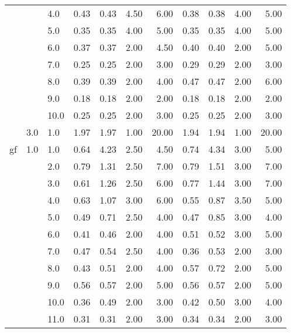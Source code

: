 \begin{tabular}{lllrrrrrrrr}
   &     & 4.0  &       0.43 &      0.43 & 4.50 &   6.00 &       0.38 &      0.38 & 4.00 &   5.00 \\
   &     & 5.0  &       0.35 &      0.35 & 4.00 &   5.00 &       0.35 &      0.35 & 4.00 &   5.00 \\
   &     & 6.0  &       0.37 &      0.37 & 2.00 &   4.50 &       0.40 &      0.40 & 2.00 &   5.00 \\
   &     & 7.0  &       0.25 &      0.25 & 2.00 &   3.00 &       0.29 &      0.29 & 2.00 &   3.00 \\
   &     & 8.0  &       0.39 &      0.39 & 2.00 &   4.00 &       0.47 &      0.47 & 2.00 &   6.00 \\
   &     & 9.0  &       0.18 &      0.18 & 2.00 &   2.00 &       0.18 &      0.18 & 2.00 &   2.00 \\
   &     & 10.0 &       0.25 &      0.25 & 2.00 &   3.00 &       0.25 &      0.25 & 2.00 &   3.00 \\
   & 3.0 & 1.0  &       1.97 &      1.97 & 1.00 &  20.00 &       1.94 &      1.94 & 1.00 &  20.00 \\
gf & 1.0 & 1.0  &       0.64 &      4.23 & 2.50 &   4.50 &       0.74 &      4.34 & 3.00 &   5.00 \\
   &     & 2.0  &       0.79 &      1.31 & 2.50 &   7.00 &       0.79 &      1.51 & 3.00 &   7.00 \\
   &     & 3.0  &       0.61 &      1.26 & 2.50 &   6.00 &       0.77 &      1.44 & 3.00 &   7.00 \\
   &     & 4.0  &       0.63 &      1.07 & 3.00 &   6.00 &       0.55 &      0.87 & 3.50 &   5.00 \\
   &     & 5.0  &       0.49 &      0.71 & 2.50 &   4.00 &       0.47 &      0.85 & 3.00 &   4.00 \\
   &     & 6.0  &       0.41 &      0.46 & 2.00 &   4.00 &       0.51 &      0.52 & 3.00 &   5.00 \\
   &     & 7.0  &       0.47 &      0.54 & 2.50 &   4.00 &       0.36 &      0.53 & 2.00 &   3.00 \\
   &     & 8.0  &       0.43 &      0.51 & 2.00 &   4.00 &       0.57 &      0.72 & 2.00 &   5.00 \\
   &     & 9.0  &       0.56 &      0.57 & 2.00 &   5.00 &       0.56 &      0.57 & 2.00 &   5.00 \\
   &     & 10.0 &       0.36 &      0.49 & 2.00 &   3.00 &       0.42 &      0.50 & 3.00 &   4.00 \\
   &     & 11.0 &       0.31 &      0.31 & 2.00 &   3.00 &       0.34 &      0.34 & 2.00 &   3.00 \\

\end{tabular}
